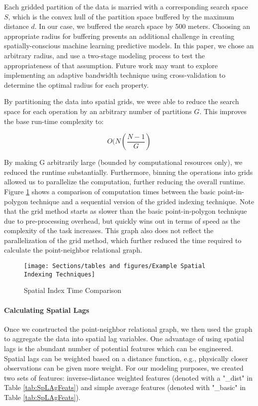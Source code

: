 \documentclass[12pt,]{article}
\let\oldparagraph\paragraph
\renewcommand{\paragraph}[1]{\oldparagraph{#1}\mbox{}}
\begin{document}
Each gridded partition of the data is married with a corresponding
search space \(S\), which is the convex hull of the partition space
buffered by the maximum distance \(d\). In our case, we buffered the
search space by 500 meters. Choosing an appropriate radius for buffering
presents an additional challenge in creating spatially-conscious machine
learning predictive models. In this paper, we chose an arbitrary radius,
and use a two-stage modeling process to test the appropriateness of that
assumption. Future work may want to explore implementing an adaptive
bandwidth technique using cross-validation to determine the optimal
radius for each property.

By partitioning the data into spatial grids, we were able to reduce the
search space for each operation by an arbitrary number of partitions
\(G\). This improves the base run-time complexity to:

\[
O(N(\frac{N-1}{G})
\]

\noindent By making G arbitrarily large (bounded by computational
resources only), we reduced the runtime substantially. Furthermore,
binning the operations into grids allowed us to parallelize the
computation, further reducing the overall runtime. Figure
\ref{fig:Spatial Indexing Process} shows a comparison of computation
times between the basic point-in-polygon technique and a sequential
version of the grided indexing technique. Note that the grid method
starts as slower than the basic point-in-polygon technique due to
pre-processing overhead, but quickly wins out in terms of speed as the
complexity of the task increases. This graph also does not reflect the
parallelization of the grid method, which further reduced the time
required to calculate the point-neighbor relational graph.

\begin{figure}[H]
\texttt{[image: Sections/tables and figures/Example Spatial Indexing Techniques]} \caption{Spatial Index Time Comparison}\label{fig:Spatial Indexing Process}
\end{figure}

\hypertarget{calculating-spatial-lags}{%
\paragraph{Calculating Spatial Lags}\label{calculating-spatial-lags}}

Once we constructed the point-neighbor relational graph, we then used
the graph to aggregate the data into spatial lag variables. One
advantage of using spatial lags is the abundant number of potential
features which can be engineered. Spatial lags can be weighted based on
a distance function, e.g., physically closer observations can be given
more weight. For our modeling purposes, we created two sets of features:
inverse-distance weighted features (denoted with a "\_dist" in Table
\ref{tab:SpLAgFeats}) and simple average features (denoted with
"\_basic" in Table \ref{tab:SpLAgFeats}).
\end{document}
